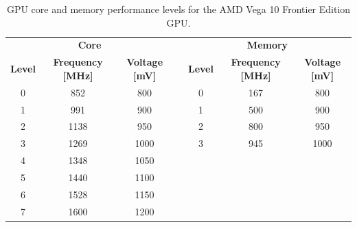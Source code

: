 \begin{table}[!htb]
\renewcommand{\arraystretch}{1.2} %
\centering
\begin{tabular}{ccclccc}
\multicolumn{3}{c}{\textbf{Core}}                                         & \multicolumn{1}{c}{\textbf{}} & \multicolumn{3}{c}{\textbf{Memory}}                                             \\
\textbf{Level} & \textbf{Frequency {[}MHz{]}} & \textbf{Voltage {[}mV{]}} &                               & \textbf{Level}       & \textbf{Frequency {[}MHz{]}} & \textbf{Voltage {[}mV{]}} \\ \cline{1-3} \cline{5-7} 
0              & 852                          & 800                       &                               & 0                    & 167                          & 800                       \\
1              & 991                          & 900                       &                               & 1                    & 500                          & 900                       \\
2              & 1138                         & 950                       &                               & 2                    & 800                          & 950                       \\
3              & 1269                         & 1000                      &                               & 3                    & 945                          & 1000                      \\ \cline{5-7} 
4              & 1348                         & 1050                      &                               & \multicolumn{1}{l}{} & \multicolumn{1}{l}{}         & \multicolumn{1}{l}{}      \\
5              & 1440                         & 1100                      &                               & \multicolumn{1}{l}{} & \multicolumn{1}{l}{}         & \multicolumn{1}{l}{}      \\
6              & 1528                         & 1150                      &                               & \multicolumn{1}{l}{} & \multicolumn{1}{l}{}         & \multicolumn{1}{l}{}      \\
7              & 1600                         & 1200                      &                               & \multicolumn{1}{l}{} & \multicolumn{1}{l}{}         & \multicolumn{1}{l}{}      \\ \cline{1-3}
\end{tabular}
\caption{GPU core and memory performance levels for the AMD Vega 10 Frontier Edition GPU.}
\label{tab:gpulevels}
\end{table}


